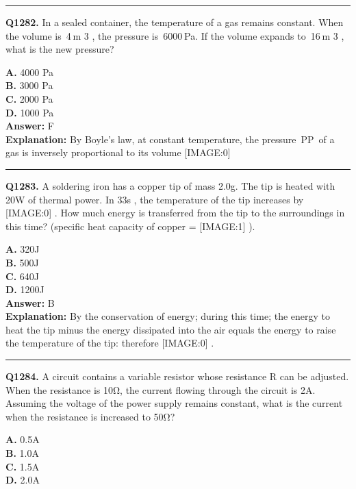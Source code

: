 \documentclass[12pt]{article}
\begin{document}
\hrule
\vspace{1em}


\noindent
\textbf{Q1282.} In a sealed container, the temperature of a gas remains constant. When the volume is 4 m
3
, the pressure is 6000 Pa. If the volume expands to 16 m
3
, what is the new pressure?



\textbf{A.} 4000 Pa \\
\textbf{B.} 3000 Pa \\
\textbf{C.} 2000 Pa \\
\textbf{D.} 1000 Pa \\

\textbf{Answer:} F \\
\textbf{Explanation:} By Boyle’s law, at constant temperature, the pressure PP of a gas is inversely proportional to its volume
[IMAGE:0]

\hrule
\vspace{1em}


\noindent
\textbf{Q1283.} A soldering iron has a copper tip of mass 2.0g.
The tip is heated with 20W
of thermal power. In 33s
, the temperature of the tip increases by
[IMAGE:0]
.
How much energy is transferred from the tip to the surroundings in this time? (specific heat capacity of copper =
[IMAGE:1]
).



\textbf{A.} 320J \\
\textbf{B.} 500J \\
\textbf{C.} 640J \\
\textbf{D.} 1200J \\

\textbf{Answer:} B \\
\textbf{Explanation:} By the conservation of energy; during this time; the energy to heat the tip minus the energy dissipated into the air equals the energy to raise the temperature of the tip: therefore
[IMAGE:0]
.

\hrule
\vspace{1em}


\noindent
\textbf{Q1284.} A circuit contains a variable resistor whose resistance R can be adjusted. When the resistance is 10Ω, the current flowing through the circuit is 2A. Assuming the voltage of the power supply remains constant, what is the current when the resistance is increased to 50Ω?



\textbf{A.} 0.5A \\
\textbf{B.} 1.0A \\
\textbf{C.} 1.5A \\
\textbf{D.} 2.0A \\
\end{document}
